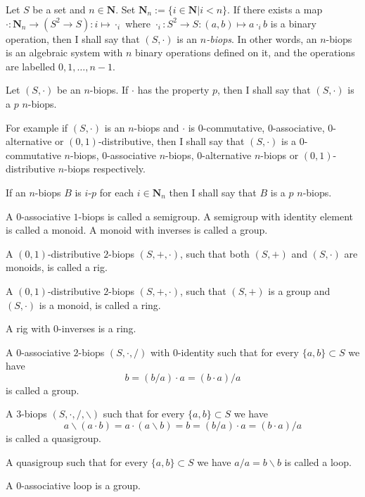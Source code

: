 \documentclass[12pt]{article}
\begin{document}
Let $S$ be a set and $n \in \mathbf{N}$. Set $\mathbf{N}_n := \{i \in \mathbf{N} | i < n \}$. If there exists a map $\cdot : \mathbf{N}_n \to (S^2 \to S) : i \mapsto \cdot_i$ where $\cdot_i : S^2 \to S : (a, b) \mapsto a \cdot_i b$ is a binary operation, then I shall say that $(S, \cdot)$ is an \emph{$n$-biops}.  In other words, an $n$-biops is an algebraic system with $n$ binary operations defined on it, and the operations are labelled $0,1,\ldots, n-1$.

Let $(S, \cdot)$ be an $n$-biops. If $\cdot$ has the property $p$, then I shall say that $(S, \cdot)$ is a $p$ $n$-biops. 

For example if $(S, \cdot)$ is an $n$-biops and $\cdot$ is $0$-commutative, $0$-associative, $0$-alternative or $(0, 1)$-distributive, then I shall say that $(S, \cdot)$ is a $0$-commutative $n$-biops, $0$-associative $n$-biops, $0$-alternative $n$-biops or $(0, 1)$-distributive $n$-biops respectively.

If an $n$-biops $B$ is $i$-$p$ for each $i \in \mathbf{N}_n$ then I shall say that $B$ is a $p$ $n$-biops.

A $0$-associative $1$-biops is called a semigroup.
A semigroup with identity element is called a monoid.
A monoid with inverses is called a group.

A $(0, 1)$-distributive $2$-biops $(S, +, \cdot)$, such that both $(S, +)$ and $(S, \cdot)$ are monoids, is called a rig.

A $(0, 1)$-distributive $2$-biops $(S, +, \cdot)$, such that $(S, +)$ is a group and $(S, \cdot)$ is a monoid, is called a ring.

A rig with $0$-inverses is a ring. 

A $0$-associative $2$-biops $(S, \cdot, /)$ with $0$-identity such that for every $\{a, b\} \subset S$ we have
$$b = (b / a) \cdot a = (b \cdot a) / a$$
is called a group.

A $3$-biops $(S, \cdot, /, \backslash)$ such that for every $\{a, b\} \subset S$ we have
$$a \backslash (a \cdot b) = a \cdot (a \backslash b) = b = (b / a) \cdot a = (b \cdot a) / a$$
is called a quasigroup.

A quasigroup such that for every $\{a, b\} \subset S$ we have $a / a = b \backslash b$  is called a loop.

A $0$-associative loop is a group.
\end{document}
